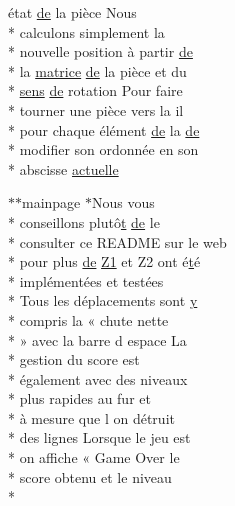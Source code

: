 \begin{DoxyCompactItemize}
état \hyperlink{mainpage_8dox_ab37fa35e77d95c6d0d0ab620c97c3db8}{de} la pièce Nous \\*
calculons simplement la \\*
nouvelle position à partir \hyperlink{mainpage_8dox_ab37fa35e77d95c6d0d0ab620c97c3db8}{de} \\*
la \hyperlink{mainpage_8dox_af2e36bcdda8980a3e5c1f4013331ee45}{matrice} \hyperlink{mainpage_8dox_ab37fa35e77d95c6d0d0ab620c97c3db8}{de} la pièce et du \\*
\hyperlink{mainpage_8dox_aa08a2c237abaf70493855740d9c5d0c8}{sens} \hyperlink{mainpage_8dox_ab37fa35e77d95c6d0d0ab620c97c3db8}{de} rotation Pour faire \\*
tourner une pièce vers la il \\*
pour chaque élément \hyperlink{mainpage_8dox_ab37fa35e77d95c6d0d0ab620c97c3db8}{de} la \hyperlink{mainpage_8dox_ab37fa35e77d95c6d0d0ab620c97c3db8}{de} \\*
modifier son ordonnée en son \\*
abscisse \hyperlink{mainpage_8dox_a0f00ab298800bde58e9f4aa9060803e5}{actuelle}
\item 
$\ast$$\ast$mainpage $\ast$Nous vous \\*
conseillons plutô\hyperlink{gl_8h_a00140d6f5c548b26daf170bf16e86a6d}{t} \hyperlink{mainpage_8dox_ab37fa35e77d95c6d0d0ab620c97c3db8}{de} le \\*
consulter ce R\-E\-A\-D\-M\-E sur le web \\*
pour plus \hyperlink{mainpage_8dox_ab37fa35e77d95c6d0d0ab620c97c3db8}{de} \hyperlink{mainpage_8dox_ac1b4262bdb6c0693bc375775d6cfa421}{Z1} et Z2 ont é\hyperlink{gl_8h_a00140d6f5c548b26daf170bf16e86a6d}{t}é \\*
implémentées et testées \\*
Tous les déplacements sont \hyperlink{gl_8h_a74d80fd479c0f6d0153c709949a089ef}{y} \\*
compris la « chute nette \\*
» avec la barre d espace La \\*
gestion du score est \\*
également avec des niveaux \\*
plus rapides au fur et \\*
à mesure que l on détruit \\*
des lignes Lorsque le jeu est \\*
on affiche « Game Over le \\*
score obtenu et le niveau \\*
$$
\end{DoxyCompactItemize}
